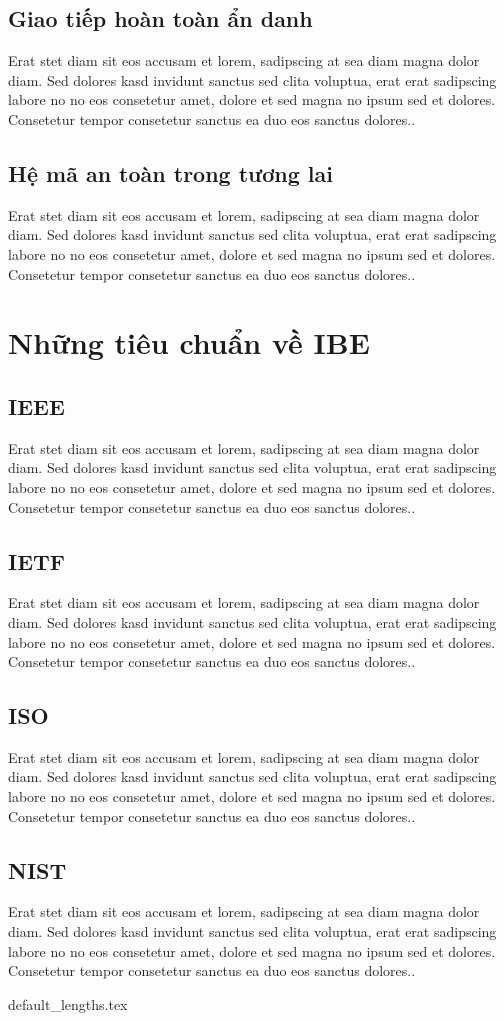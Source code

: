 \documentclass[class=report, crop=false]{standalone}
\begin{document}
		\subsection{Giao tiếp hoàn toàn ẩn danh}
			Erat stet diam sit eos accusam et lorem, sadipscing at sea diam magna dolor diam. Sed dolores kasd invidunt sanctus sed clita voluptua, erat erat sadipscing labore no no eos consetetur amet, dolore et sed magna no ipsum sed et dolores. Consetetur tempor consetetur sanctus ea duo eos sanctus dolores..
		\subsection{Hệ mã an toàn trong tương lai}
			Erat stet diam sit eos accusam et lorem, sadipscing at sea diam magna dolor diam. Sed dolores kasd invidunt sanctus sed clita voluptua, erat erat sadipscing labore no no eos consetetur amet, dolore et sed magna no ipsum sed et dolores. Consetetur tempor consetetur sanctus ea duo eos sanctus dolores..
	\section{Những tiêu chuẩn về IBE}
		\subsection{IEEE}
			Erat stet diam sit eos accusam et lorem, sadipscing at sea diam magna dolor diam. Sed dolores kasd invidunt sanctus sed clita voluptua, erat erat sadipscing labore no no eos consetetur amet, dolore et sed magna no ipsum sed et dolores. Consetetur tempor consetetur sanctus ea duo eos sanctus dolores..
		\subsection{IETF}
			Erat stet diam sit eos accusam et lorem, sadipscing at sea diam magna dolor diam. Sed dolores kasd invidunt sanctus sed clita voluptua, erat erat sadipscing labore no no eos consetetur amet, dolore et sed magna no ipsum sed et dolores. Consetetur tempor consetetur sanctus ea duo eos sanctus dolores..
		\subsection{ISO}
			Erat stet diam sit eos accusam et lorem, sadipscing at sea diam magna dolor diam. Sed dolores kasd invidunt sanctus sed clita voluptua, erat erat sadipscing labore no no eos consetetur amet, dolore et sed magna no ipsum sed et dolores. Consetetur tempor consetetur sanctus ea duo eos sanctus dolores..
		\subsection{NIST}
			Erat stet diam sit eos accusam et lorem, sadipscing at sea diam magna dolor diam. Sed dolores kasd invidunt sanctus sed clita voluptua, erat erat sadipscing labore no no eos consetetur amet, dolore et sed magna no ipsum sed et dolores. Consetetur tempor consetetur sanctus ea duo eos sanctus dolores..
	

	\newpage
	{default_lengths.tex}
\end{document}
